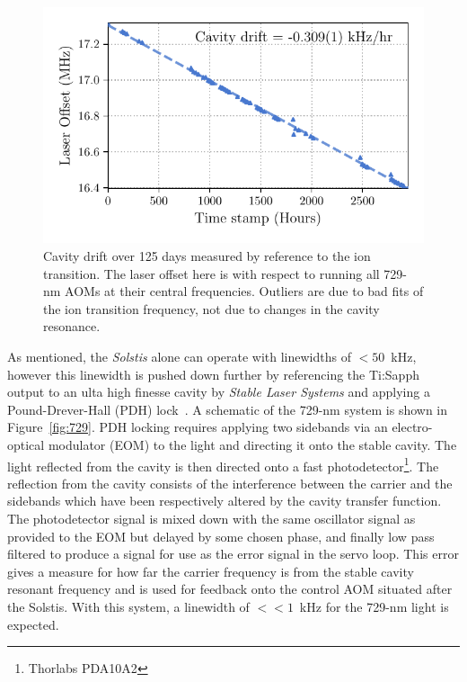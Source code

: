     \begin{figure}
        \begin{center}
        \noindent\includegraphics[width=0.75\linewidth]{
            figures/pdf_figure/cavity_drift.pdf
            }
        \end{center}
        \caption{
            Cavity drift over 125 days measured by reference to the ion transition. The laser offset here is with respect to running all 729-nm AOMs at their central frequencies. Outliers are due to bad fits of the ion transition frequency, not due to changes in the cavity resonance.
            }
        \label{fig:Cavity Drift}
    \end{figure}
    As mentioned, the \emph{Solstis} alone can operate with linewidths of
    $<50$~kHz, however this linewidth is pushed down further by referencing the Ti:Sapph output
    to an ulta high finesse cavity by \emph{Stable Laser Systems} and applying
    a Pound-Drever-Hall (PDH) lock~\cite{}.  A schematic of the 729-nm system is
    shown in Figure~\ref{fig:729}.  PDH locking requires applying two sidebands
    via an electro-optical modulator (EOM) to the light and directing it onto
    the stable cavity. The light reflected from the cavity is then directed onto
    a fast photodetector\footnote{Thorlabs PDA10A2}. The reflection from the
    cavity consists of the interference between the carrier and the sidebands
    which have been respectively altered by the cavity transfer function. The
    photodetector signal is mixed down with the same oscillator signal as
    provided to the EOM but delayed by some chosen phase, and finally low pass
    filtered to produce a signal for use as the error signal in the servo loop.
    This error gives a measure for how far the carrier frequency is from the
    stable cavity resonant frequency and is used for feedback onto the control
    AOM situated after the Solstis.
    With this system, a linewidth of $<<1$~kHz for the 729-nm light is expected. 
